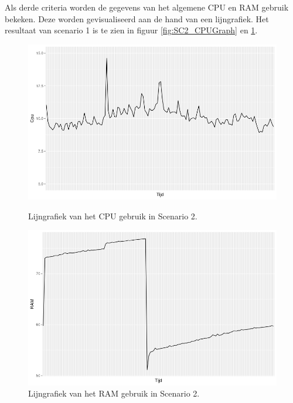 Als derde criteria worden de gegevens van het algemene CPU en RAM gebruik bekeken. Deze worden gevisualiseerd aan de hand van een lijngrafiek. Het resultaat van scenario 1 is te zien in figuur \ref{fig:SC2_CPUGraph} en \ref{fig:SC2_RAMGraph}. 
\begin{figure}[h]
	\centering
	\begin{minipage}[b]{0.45\linewidth}
		\includegraphics[width=\linewidth]{img/SC2_CPUGraph.png}
		\caption{Lijngrafiek van het CPU gebruik in Scenario 2.}
		\label{fig:SC2_CPUGraph}
	\end{minipage}
	\quad
	\begin{minipage}[b]{0.45\linewidth}
		\includegraphics[width=\linewidth]{img/SC2_RAMGraph.png}
		\caption{Lijngrafiek van het RAM gebruik in Scenario 2.}
		\label{fig:SC2_RAMGraph}
	\end{minipage}
\end{figure}

%


